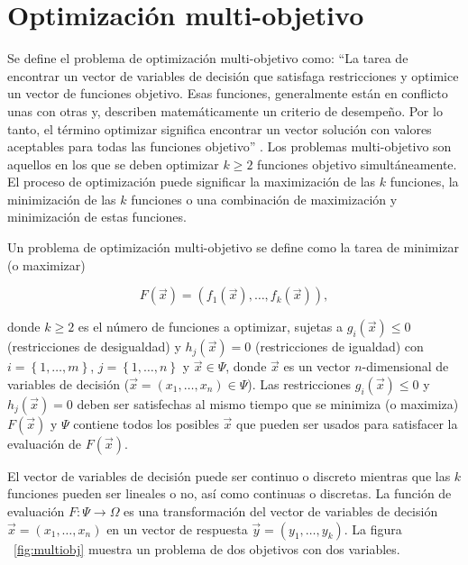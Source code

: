 \section{Optimizaci\'on multi-objetivo}
  
      Se define el problema de optimizaci\'on multi-objetivo como: ``La tarea de encontrar un vector de variables 
      de decisi\'on que satisfaga restricciones y optimice un vector de funciones objetivo. Esas funciones, generalmente est\'an
      en conflicto unas con otras y, describen matem\'aticamente un criterio de desempe\~no. Por lo tanto, el t\'ermino 
      optimizar significa encontrar un vector soluci\'on con valores aceptables para todas las funciones objetivo'' \cite{EASMC85}. 
      Los problemas multi-objetivo son aquellos en los que se deben optimizar $k \geq 2$ funciones objetivo simult\'aneamente. 
      El proceso de optimizaci\'on puede significar la maximizaci\'on de las $k$ funciones, la minimizaci\'on de las $k$ 
      funciones o una combinaci\'on de maximizaci\'on y minimizaci\'on de estas funciones.

      \begin{definicion}
	  Un problema de optimizaci\'on multi-objetivo se define como la tarea de minimizar (o maximizar) 
	  
	  \[F\left(\vec{x}\right)=\left(f_1\left(\vec{x}\right), \ldots,f_k\left(\vec{x}\right) \right),\]
	  
	  {\setlength{\parindent}{0pt}
	  
	  donde $k\geq 2$ es el n\'umero de funciones a optimizar, sujetas a $g_i\left(\vec{x}\right) \leq 0 $ (restricciones de 
	  desigualdad) y $h_j\left(\vec{x}\right) = 0 $ (restricciones de igualdad) con $i = \left\{1, \ldots, m \right\}$, $j = \left\{1, \ldots, n \right\}$ 
	  y $\vec{x} \in \Psi $, donde $\vec{x}$ es un vector $n$-dimensional de variables de decisi\'on ($\vec{x} = \left(x_1 , \ldots, x_n \right) \in \Psi$). 
	  Las restricciones $g_i\left(\vec{x}\right) \leq 0$ y $h_j\left(\vec{x}\right) = 0$ deben ser satisfechas 
	  al mismo tiempo que se minimiza (o maximiza) $F\left(\vec{x}\right)$ y $\Psi $ contiene todos los posibles 
	  $\vec{x}$ que pueden ser usados para satisfacer la evaluaci\'on de $F\left(\vec{x}\right)$.
	  }
      \end{definicion}

      El vector de variables de decisi\'on puede ser continuo o discreto mientras que las $k$ funciones pueden ser 
      lineales o no, as\'i como continuas o discretas. La funci\'on de evaluaci\'on $F:\Psi \rightarrow \Omega$ es una transformaci\'on 
      del vector de variables de decisi\'on $\vec{x} = \left(x_1 , \ldots, x_n \right)$ en un vector de respuesta 
      $\vec{y} = \left(y_1 , \ldots, y_k \right)$. La figura ~\ref{fig:multiobj} muestra un problema de dos objetivos con dos variables.
      
